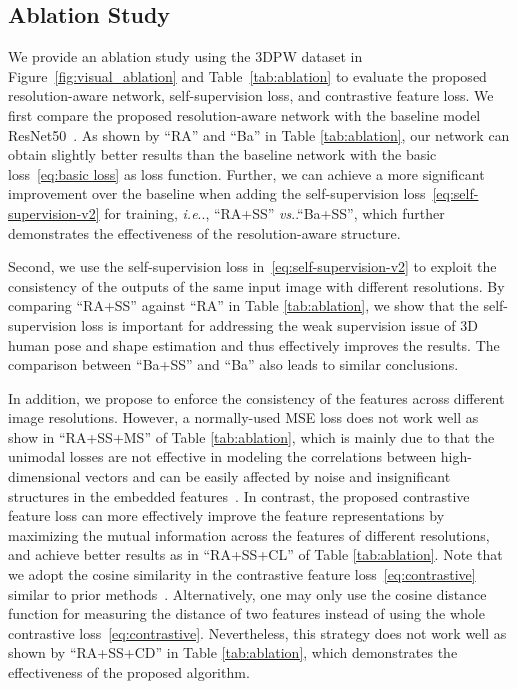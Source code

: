 \documentclass[runningheads]{llncs}
\makeatletter
\DeclareRobustCommand\onedot{\futurelet\@let@token\@onedot}
\def\@onedot{\ifx\@let@token.\else.\null\fi\xspace}
\def\ie{\emph{i.e}\onedot, } \def\Ie{\emph{I.e}\onedot}
\def\vs{\emph{vs}\onedot }
\makeatother
\begin{document}
\subsection{Ablation Study}
We provide an ablation study using the 3DPW dataset in Figure~\ref{fig:visual_ablation} and Table~\ref{tab:ablation} to evaluate the proposed resolution-aware network, self-supervision loss, and contrastive feature loss.
We first compare the proposed resolution-aware network with the baseline model ResNet50~\cite{kanazawa2018end,resnet}. 
As shown by ``RA'' and ``Ba'' in Table \ref{tab:ablation}, our network can obtain slightly better results than the baseline network with the basic loss~\eqref{eq:basic loss} as loss function.
Further, we can achieve a more significant improvement over the baseline when adding the self-supervision loss~\eqref{eq:self-supervision-v2} for training, \ie ``RA+SS'' \vs ``Ba+SS'', which further demonstrates the effectiveness of the resolution-aware structure.


Second, we use the self-supervision loss in~\eqref{eq:self-supervision-v2} to exploit the consistency of the outputs of the same input image with different resolutions.
By comparing ``RA+SS'' against ``RA'' in Table \ref{tab:ablation}, we show that the self-supervision loss is important for addressing the weak supervision issue of  3D human pose and shape estimation and thus effectively improves the results. 
The comparison between ``Ba+SS'' and ``Ba'' also leads to similar conclusions.


In addition, we propose to enforce the consistency of the features across different image resolutions.
However, a normally-used MSE loss does not work well as show in ``RA+SS+MS'' of Table \ref{tab:ablation}, which is mainly due to that the unimodal losses are not effective in modeling the correlations between high-dimensional vectors and can be easily affected by noise and insignificant structures in the embedded features~\cite{oord2018representation}. 
In contrast, the proposed contrastive feature loss can more effectively improve the feature representations by maximizing the mutual information across the features of different resolutions, and achieve better results as in ``RA+SS+CL'' of Table \ref{tab:ablation}.
Note that we adopt the cosine similarity in the contrastive feature loss~\eqref{eq:contrastive} similar to prior methods~\cite{oord2018representation,he2019momentum,tian2019contrastive}. 
Alternatively, one may only use the cosine distance function for measuring the distance of two features instead of using the whole contrastive loss~\eqref{eq:contrastive}.
Nevertheless, this strategy does not work well as shown by ``RA+SS+CD'' in Table \ref{tab:ablation}, which demonstrates the effectiveness of the proposed algorithm.
\end{document}
